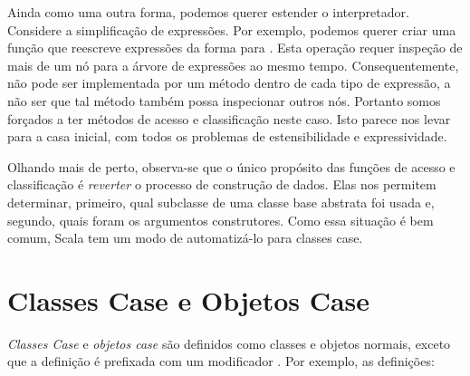Ainda como uma outra forma, podemos querer estender o interpretador. 
Considere a simplifica\c{c}\~{a}o de express\~{o}es. Por exemplo, podemos querer criar 
uma fun\c{c}\~{a}o que reescreve express\~{o}es da forma  para 
. Esta opera\c{c}\~{a}o requer inspe\c{c}\~{a}o de mais de um n\'{o} para a 
\'{a}rvore de express\~{o}es ao mesmo tempo. Consequentemente, n\~{a}o pode ser implementada
por um m\'{e}todo dentro de cada tipo de express\~{a}o, a n\~{a}o ser que tal m\'{e}todo tamb\'{e}m 
possa inspecionar outros n\'{o}s. Portanto somos for\c{c}ados a ter m\'{e}todos de acesso e 
classifica\c{c}\~{a}o neste caso. Isto parece nos levar para a casa inicial, com todos os 
problemas de estensibilidade e expressividade.

Olhando mais de perto, observa-se que o \'{u}nico prop\'{o}sito das fun\c{c}\~{o}es de acesso
e classifica\c{c}\~{a}o  \'{e} {\em reverter} o processo de constru\c{c}\~{a}o de dados. Elas nos 
permitem determinar, primeiro, qual subclasse de uma classe base abstrata foi 
usada e, segundo, quais foram os argumentos construtores. Como essa situa\c{c}\~{a}o \'{e} 
bem comum, Scala tem um modo de automatiz\'{a}-lo para classes case.

\section{Classes Case e Objetos Case}

{\em Classes Case} e {\em objetos case} s\~{a}o definidos como classes e objetos 
normais, exceto que a defini\c{c}\~{a}o \'{e} prefixada com um modificador . 
Por exemplo, as defini\c{c}\~{o}es:

